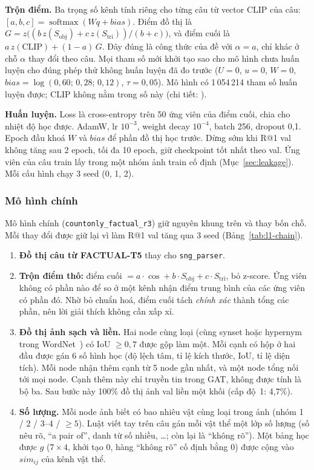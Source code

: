 \textbf{Trộn điểm.} Ba trọng số kênh tính riêng cho từng câu từ vector CLIP của câu:
$[a, b, c] = \operatorname{softmax}(W q + \mathit{bias})$. Điểm đồ thị là
$G = z\big((b\,z(S_\text{obj}) + c\,z(S_\text{tri}))/(b+c)\big)$, và điểm cuối là $a\,z(\text{CLIP}) + (1-a)\,G$. Đây
đúng là công thức của đề với $\alpha = a$, chỉ khác ở chỗ $\alpha$ thay đổi theo câu. Mọi tham số mới khởi tạo sao cho mô
hình chưa huấn luyện cho đúng phép thử không huấn luyện đã đo trước ($U=0$, $u=0$, $W=0$,
$\mathit{bias} = \log(0{,}60;\,0{,}28;\,0{,}12)$, $\tau = 0{,}05$). Mô hình có 1\,054\,214 tham số huấn luyện được; CLIP
không nằm trong số này (chi tiết: ).

\textbf{Huấn luyện.} Loss là cross-entropy trên 50 ứng viên của điểm cuối, chia cho nhiệt độ học được. AdamW, lr
$10^{-3}$, weight decay $10^{-4}$, batch 256, dropout 0,1. Epoch đầu khoá $W$ và $\mathit{bias}$ để phần đồ thị học trước.
Dừng sớm khi R@1 val không tăng sau 2 epoch, tối đa 10 epoch, giữ checkpoint tốt nhất theo val. Ứng viên của câu train lấy
trong một nhóm ảnh train cố định (Mục~\ref{sec:leakage}). Mỗi cấu hình chạy 3 seed (0, 1, 2).

\subsubsection{Mô hình chính}\label{sec:method-main}
Mô hình chính (\texttt{countonly\_factual\_r3}) giữ nguyên khung trên và thay bốn chỗ. Mỗi thay đổi được giữ lại vì làm R@1
val tăng qua 3 seed (Bảng~\ref{tab:l1-chain}).
\begin{enumerate}
\item \textbf{Đồ thị câu từ FACTUAL-T5} thay cho \texttt{sng\_parser}.
\item \textbf{Trộn điểm thô:} điểm cuối $= a\cdot\cos + b\cdot S_\text{obj} + c\cdot S_\text{tri}$, bỏ z-score. Ứng viên
không có phần nào để so ở một kênh nhận điểm trung bình của các ứng viên có phần đó. Nhờ bỏ chuẩn hoá, điểm cuối tách
\emph{chính xác} thành tổng các phần, nên lời giải thích không cần xấp xỉ.
\item \textbf{Đồ thị ảnh sạch và liền.} Hai node cùng loại (cùng synset hoặc hypernym trong WordNet~\cite{miller1995wordnet})
có IoU $\ge 0{,}7$ được gộp làm một. Mỗi cạnh có hộp ở hai đầu được gán 6 số hình học (độ lệch tâm, tỉ lệ kích thước, IoU,
tỉ lệ diện tích). Mỗi node nhận thêm cạnh từ 5 node gần nhất, và một node tổng nối tới mọi node. Cạnh thêm này chỉ truyền tin
trong GAT, không được tính là bộ ba. Sau bước này 100\% đồ thị ảnh val liền một khối (cấp độ~1: 4,7\%).
\item \textbf{Số lượng.} Mỗi node ảnh biết có bao nhiêu vật cùng loại trong ảnh (nhóm 1 / 2 / 3--4 / $\ge5$). Luật viết tay
trên câu gán mỗi vật thể một lớp số lượng (số nêu rõ, ``a pair of'', danh từ số nhiều, \dots; còn lại là ``không rõ''). Một
bảng học được $g$ ($7\times4$, khởi tạo 0, hàng ``không rõ'' cố định bằng 0) được cộng vào $\mathit{sim}_{ij}$ của kênh vật
thể.
\end{enumerate}

